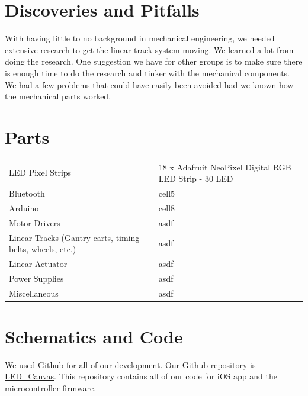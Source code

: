 \documentclass[12pt]{article}
\begin{document}
\begin{appendices}
  \section{Discoveries and Pitfalls}
  With having little to no background in mechanical engineering, we needed extensive research to get the linear track system moving. We learned a lot from doing the research. One suggestion we have for other groups is to make sure there is enough time to do the research and tinker with the mechanical components. We had a few problems that could have easily been avoided had we known how the mechanical parts worked.

  \section{Parts}
  \begin{tabular}{ p{5cm} l }
    LED Pixel Strips             & 18 x Adafruit NeoPixel Digital RGB LED Strip - 30 LED \\[0.2cm]
    Bluetooth                    & cell5 \\  
    Arduino                      & cell8 \\
    Motor Drivers                & asdf  \\
    Linear Tracks (Gantry carts,
    timing belts, wheels, etc.)  & asdf  \\
    Linear Actuator              & asdf  \\
    Power Supplies               & asdf  \\
    Miscellaneous                & asdf  \\
  \end{tabular}
  
  \section{Schematics and Code}
  We used Github for all of our development. Our Github repository is \href{https://github.com/rajp20/LED_Canvas}{LED\_Canvas}. This repository contains all of our code for iOS app and the microcontroller firmware. 
\end{appendices}
\end{document}
